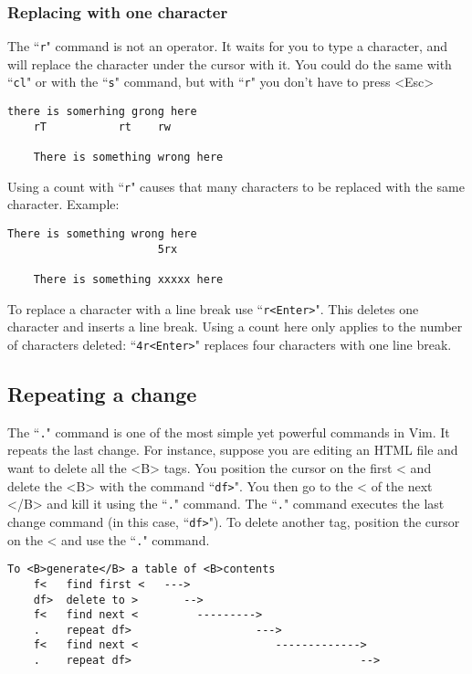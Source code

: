 \subsubsection{Replacing with one character}

The ``\texttt{r}" command is not an operator.
It waits for you to type a character, and will replace the character under the cursor with it.
You could do the same with ``\texttt{cl}" or with the ``\texttt{s}" command, but with ``\texttt{r}" you don't have to press <Esc>

\begin{Verbatim}[samepage=true]
    there is somerhing grong here 
    rT           rt    rw

    There is something wrong here 
\end{Verbatim}

Using a count with ``\texttt{r}" causes that many characters to be replaced with the same character.
Example:

\begin{Verbatim}[samepage=true]
    There is something wrong here 
                       5rx

    There is something xxxxx here 
\end{Verbatim}

To replace a character with a line break use ``\texttt{r<Enter>}".
This deletes one character and inserts a line break.
Using a count here only applies to the number of characters deleted: ``\texttt{4r<Enter>}" replaces four characters with one line break.

\subsection{Repeating a change}

The ``\texttt{.}" command is one of the most simple yet powerful commands in Vim.
It repeats the last change.
For instance, suppose you are editing an HTML file and want to delete all the <B> tags.
You position the cursor on the first < and delete the <B> with the command ``\texttt{df>}".
You then go to the < of the next </B> and kill it using the ``\texttt{.}" command.
The ``\texttt{.}" command executes the last change command (in this case, ``\texttt{df>}").
To delete another tag, position the cursor on the < and use the ``\texttt{.}" command.

\begin{Verbatim}[samepage=true]
                        To <B>generate</B> a table of <B>contents 
    f<   find first <   --->
    df>  delete to >       -->
    f<   find next <         --------->
    .    repeat df>                   --->
    f<   find next <                     ------------->
    .    repeat df>                                   -->
\end{Verbatim}

